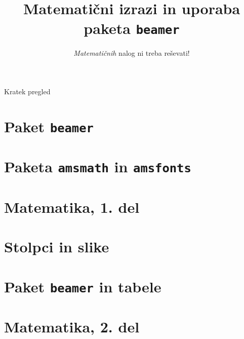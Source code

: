 \documentclass{beamer}
\title{Matematični izrazi in uporaba paketa \texttt{beamer}}
\subtitle{\emph{Matematičnih} nalog ni treba reševati!}
\institute{Fakulteta za matematiko in fiziko}
\date{}
\begin{document}

\begin{frame}
    \titlepage 
\end{frame}


\begin{frame}{Kratek pregled}
    \tableofcontents
\end{frame}

\section{Paket \texttt{beamer}}


\section{Paketa \texttt{amsmath} in \texttt{amsfonts}}


\section[Matematika, 1. del\\\large{Analiza, logika, množice}]{Matematika, 1. del}


\section{Stolpci in slike}


\section{Paket \texttt{beamer} in tabele}


\section[Matematika, 2. del\\\large{Zaporedja, algebra, grupe}]{Matematika, 2. del}

\end{document}
